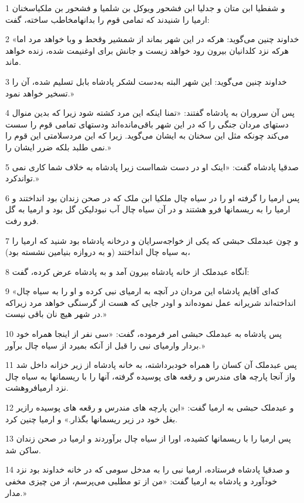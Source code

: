 \par 1 و شفطیا ابن متان و جدلیا ابن فشحور ویوکل بن شلمیا و فشحور بن ملکیاسخنان ارمیا را شنیدند که تمامی قوم را بدانهامخاطب ساخته، گفت:
\par 2 «خداوند چنین می‌گوید: هر‌که در این شهر بماند از شمشیر وقحط و وبا خواهد مرد اما هر‌که نزد کلدانیان بیرون رود خواهد زیست و جانش برای اوغنیمت شده، زنده خواهد ماند.
\par 3 خداوند چنین می‌گوید: این شهر البته به‌دست لشکر پادشاه بابل تسلیم شده، آن را تسخیر خواهد نمود.»
\par 4 پس آن سروران به پادشاه گفتند: «تمنا اینکه این مرد کشته شود زیرا که بدین منوال دستهای مردان جنگی را که در این شهر باقی‌مانده‌اند ودستهای تمامی قوم را سست می‌کند چونکه مثل این سخنان به ایشان می‌گوید. زیرا که این مردسلامتی این قوم را نمی طلبد بلکه ضرر ایشان را.»
\par 5 صدقیا پادشاه گفت: «اینک او در دست شمااست زیرا پادشاه به خلاف شما کاری نمی تواندکرد.»
\par 6 پس ارمیا را گرفته او را در سیاه چال ملکیا ابن ملک که در صحن زندان بود انداختند و ارمیا را به ریسمانها فرو هشتند و در آن سیاه چال آب نبودلیکن گل بود و ارمیا به گل فرو رفت.
\par 7 و چون عبدملک حبشی که یکی از خواجه‌سرایان و درخانه پادشاه بود شنید که ارمیا را به سیاه چال انداختند (و به دروازه بنیامین نشسته بود)،
\par 8 آنگاه عبدملک از خانه پادشاه بیرون آمد و به پادشاه عرض کرده، گفت:
\par 9 «که‌ای آقایم پادشاه این مردان در آنچه به ارمیای نبی کرده و او را به سیاه چال انداخته‌اند شریرانه عمل نموده‌اند و اودر جایی که هست از گرسنگی خواهد مرد زیراکه در شهر هیچ نان باقی نیست.»
\par 10 پس پادشاه به عبدملک حبشی امر فرموده، گفت: «سی نفر از اینجا همراه خود بردار وارمیای نبی را قبل از آنکه بمیرد از سیاه چال برآور.»
\par 11 پس عبدملک آن کسان را همراه خودبرداشته، به خانه پادشاه از زیر خزانه داخل شد واز آنجا پارچه های مندرس و رقعه های پوسیده گرفته، آنها را با ریسمانها به سیاه چال نزد ارمیافروهشت.
\par 12 و عبدملک حبشی به ارمیا گفت: «این پارچه های مندرس و رقعه های پوسیده رازیر بغل خود در زیر ریسمانها بگذار.» و ارمیا چنین کرد.
\par 13 پس ارمیا را با ریسمانها کشیده، اورا از سیاه چال برآوردند و ارمیا در صحن زندان ساکن شد.
\par 14 و صدقیا پادشاه فرستاده، ارمیا نبی را به مدخل سومی که در خانه خداوند بود نزد خودآورد و پادشاه به ارمیا گفت: «من از تو مطلبی می‌پرسم، از من چیزی مخفی مدار.»
